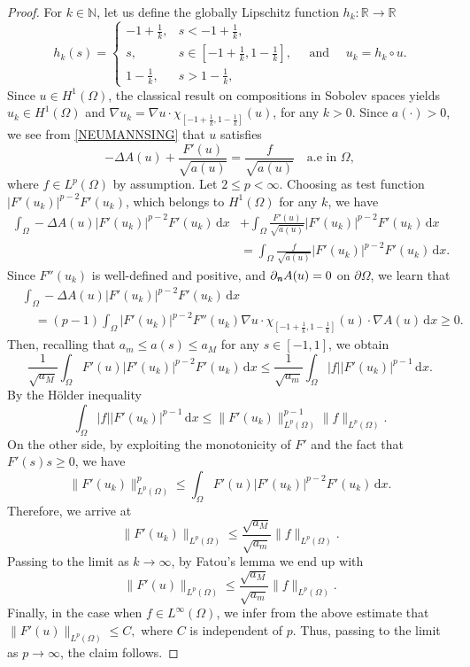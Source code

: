 \documentclass[11pt,reqno]{amsart}
\theoremstyle{remark}
\def\n{\textbf{\textit{n}}}
\def\u{u}
\numberwithin{equation}{section}
\begin{document}
\begin{proof}
For $k\in \mathbb{N}$, let us define the globally Lipschitz function $h_k: \mathbb{R}\rightarrow \mathbb{R}$
\begin{equation}
\label{trunc}
h_k(s)=
\begin{cases}
-1+\frac1k,&s<-1+\frac1k, \\
s,& s\in [-1+\frac1k,1-\frac1k],\\
1-\frac1k,&s>1-\frac1k,
\end{cases} \quad \text{and }\quad \u_k=h_k \circ \u.
\end{equation}
Since $\u\in H^1(\Omega)$, the classical result on compositions in Sobolev spaces yields $\u_k \in H^1(\Omega)$ and
$\nabla \u_k=\nabla \u \cdot\chi_{[-1+\frac1k,1-\frac1k]} (\u)$, for any $k>0$.
Since $a(\cdot)>0$, we see from \eqref{NEUMANNSING} that $u$ satisfies
$$
-\Delta A(\u)+\frac{F'(\u)}{\sqrt{a(\u)}}=\frac{f}{\sqrt{a(\u)}} \quad \text{a.e in } \Omega,
$$
where $f \in L^p(\Omega)$ by assumption.
Let $2\leq p < \infty$. Choosing as test function $|F'(\u_k)|^{p-2}F'(\u_k)$, which belongs to $H^1(\Omega)$ for any $k$, we have
\begin{align*}
\int_\Omega -\Delta A(\u)  |F'(\u_k)|^{p-2}F'(\u_k) \, \mathrm{d}x
&+\int_\Omega
\frac{F'(\u)}{\sqrt{a(\u)}} |F'(\u_k)|^{p-2}F'(\u_k) \, \mathrm{d}x
\\
&=
\int_\Omega \frac{f}{\sqrt{a(\u)}}  |F'(\u_k)|^{p-2}F'(\u_k) \, \mathrm{d}x.
\end{align*}
Since $F''(\u_k)$ is well-defined and positive, and $\partial_\n A(\u)=0$ on $\partial \Omega$, we learn that
\begin{align*}
&\int_\Omega -\Delta A(\u)  |F'(\u_k)|^{p-2}F'(\u_k) \, \mathrm{d}x
\\
&\quad =(p-1) \int_\Omega |F'(\u_k)|^{p-2}F''(\u_k)\nabla \u\cdot
\chi_{[-1+\frac1k,1-\frac1k]}(\u) \cdot \nabla A(\u) \, \mathrm{d}x \geq 0.
\end{align*}
Then, recalling that $a_m \le a(s) \le a_M$ for any $s \in [-1,1]$, we obtain
$$
\frac{1}{\sqrt{a_M}} \int_\Omega F'(\u)  |F'(\u_k)|^{p-2}F'(\u_k) \, \mathrm{d}x
\leq \frac{1}{\sqrt{a_m}} \int_\Omega |f|  |F'(\u_k)|^{p-1} \, \mathrm{d}x.
$$
By the H\"{o}lder inequality
$$
\int_\Omega |f|  |F'(\u_k)|^{p-1} \, \mathrm{d}x
\leq \|F'(\u_k)\|_{L^{p}(\Omega)}^{p-1} \|f\|_{L^{p}(\Omega)}.
$$
On the other side, by exploiting the monotonicity of $F'$ and the fact that $F'(s)s \geq 0$, we have
$$
\|F'(\u_k)\|^p_{L^{p}(\Omega)}\leq \int_\Omega F'(\u)  |F'(\u_k)|^{p-2}F'(\u_k) \, \mathrm{d}x.
$$
Therefore, we arrive at
$$
\| F'(\u_k)\|_{L^p(\Omega)}\leq \frac{\sqrt{a_M}}{\sqrt{a_m}}\| f\|_{L^p(\Omega)}.
$$
Passing to the limit as $k\to \infty$, by Fatou's lemma we end up with
$$
\| F'(\u)\|_{L^p(\Omega)}\leq \frac{\sqrt{a_M}}{\sqrt{a_m}} \| f\|_{L^p(\Omega)}.
$$
Finally, in the case when $f\in L^{\infty}(\Omega)$, we infer from the above estimate that
$
\| F'(\u)\|_{L^p(\Omega)}\leq C,
$
where $C$ is independent of $p$. Thus, passing to the limit as $p \to \infty$, the claim follows.
\end{proof}
\end{document}

